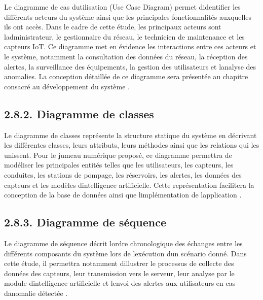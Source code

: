 \documentclass[12pt,a4paper,oneside]{report}
\begin{document}
Le diagramme de cas d\textquotesingle utilisation (Use Case Diagram)
permet d\textquotesingle identifier les différents acteurs du système
ainsi que les principales fonctionnalités auxquelles ils ont accès. Dans
le cadre de cette étude, les principaux acteurs sont
l\textquotesingle administrateur, le gestionnaire du réseau, le
technicien de maintenance et les capteurs IoT. Ce diagramme met en
évidence les interactions entre ces acteurs et le système, notamment la
consultation des données du réseau, la réception des alertes, la
surveillance des équipements, la gestion des utilisateurs et
l\textquotesingle analyse des anomalies. La conception détaillée de ce
diagramme sera présentée au chapitre consacré au développement du
système \cite{ref124}.

\subsection{\texorpdfstring{\textbf{2.8.2. Diagramme de
classes}}{2.8.2. Diagramme de classes}}\label{diagramme-de-classes}

Le diagramme de classes représente la structure statique du système en
décrivant les différentes classes, leurs attributs, leurs méthodes ainsi
que les relations qui les unissent. Pour le jumeau numérique proposé, ce
diagramme permettra de modéliser les principales entités telles que les
utilisateurs, les capteurs, les conduites, les stations de pompage, les
réservoirs, les alertes, les données des capteurs et les modèles
d\textquotesingle intelligence artificielle. Cette représentation
facilitera la conception de la base de données ainsi que
l\textquotesingle implémentation de l\textquotesingle application
\cite{ref123}.

\subsection{\texorpdfstring{\textbf{2.8.3. Diagramme de
séquence}}{2.8.3. Diagramme de séquence}}\label{diagramme-de-suxe9quence}

Le diagramme de séquence décrit l\textquotesingle ordre chronologique
des échanges entre les différents composants du système lors de
l\textquotesingle exécution d\textquotesingle un scénario donné. Dans
cette étude, il permettra notamment d\textquotesingle illustrer le
processus de collecte des données des capteurs, leur transmission vers
le serveur, leur analyse par le module d\textquotesingle intelligence
artificielle et l\textquotesingle envoi des alertes aux utilisateurs en
cas d\textquotesingle anomalie détectée \cite{ref125}.
\end{document}
